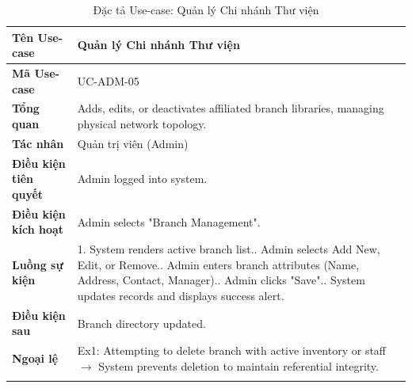 \begin{longtable}{|p{3.5cm}|p{11.5cm}|}
    \hline
    \textbf{Tên Use-case} & \textbf{Quản lý Chi nhánh Thư viện} \\
    \hline
    \textbf{Mã Use-case} & UC-ADM-05 \\
    \hline
    \textbf{Tổng quan} & Adds, edits, or deactivates affiliated branch libraries, managing physical network topology. \\
    \hline
    \textbf{Tác nhân} & Quản trị viên (Admin) \\
    \hline
    \textbf{Điều kiện tiên quyết} & Admin logged into system. \\
    \hline
    \textbf{Điều kiện kích hoạt} & Admin selects "Branch Management". \\
    \hline
    \textbf{Luồng sự kiện} & 
    1. System renders active branch list.\newline
    2. Admin selects Add New, Edit, or Remove.\newline
    3. Admin enters branch attributes (Name, Address, Contact, Manager).\newline
    4. Admin clicks "Save".\newline
    5. System updates records and displays success alert. \\
    \hline
    \textbf{Điều kiện sau} & Branch directory updated. \\
    \hline
    \textbf{Ngoại lệ} & 
    Ex1: Attempting to delete branch with active inventory or staff $\rightarrow$ System prevents deletion to maintain referential integrity. \\
    \hline
    \caption{Đặc tả Use-case: Quản lý Chi nhánh Thư viện}
\end{longtable}

